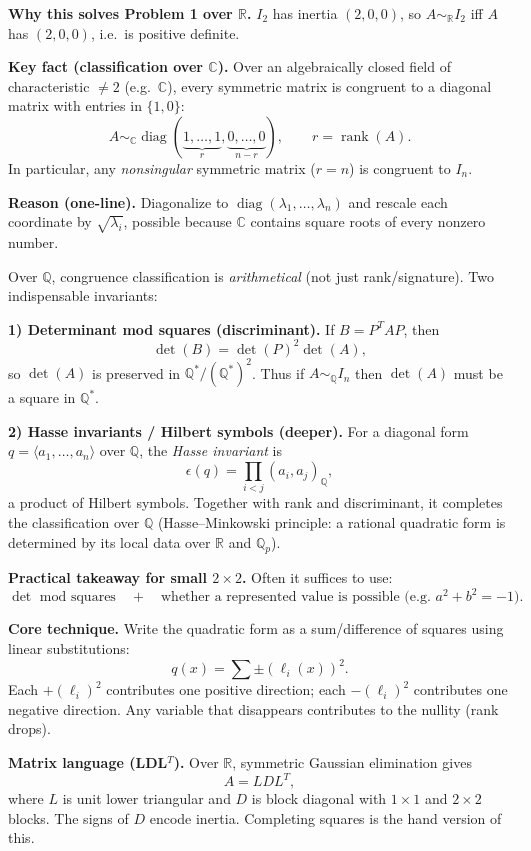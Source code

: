 \begin{problem}[CP-I-0055]
\textbf{Why this solves Problem 1 over $\mathbb R$.}
$I_2$ has inertia $(2,0,0)$, so $A\sim_{\mathbb R}I_2$ iff $A$ has $(2,0,0)$, i.e.\ is positive definite.

\textbf{Key fact (classification over $\mathbb C$).}
Over an algebraically closed field of characteristic $\neq 2$ (e.g.\ $\mathbb C$),
every symmetric matrix is congruent to a diagonal matrix with entries in $\{1,0\}$:
\[
A \sim_{\mathbb C} \operatorname{diag}(\underbrace{1,\dots,1}_{r},\underbrace{0,\dots,0}_{n-r}),
\qquad r=\operatorname{rank}(A).
\]
In particular, any \emph{nonsingular} symmetric matrix ($r=n$) is congruent to $I_n$.

\textbf{Reason (one-line).}
Diagonalize to $\operatorname{diag}(\lambda_1,\dots,\lambda_n)$ and rescale each coordinate by $\sqrt{\lambda_i}$,
possible because $\mathbb C$ contains square roots of every nonzero number.

Over $\mathbb Q$, congruence classification is \emph{arithmetical} (not just rank/signature).
Two indispensable invariants:

\textbf{1) Determinant mod squares (discriminant).}
If $B=P^TAP$, then
\[
\det(B)=\det(P)^2\det(A),
\]
so $\det(A)$ is preserved in $\mathbb Q^*/(\mathbb Q^*)^2$.
Thus if $A\sim_{\mathbb Q}I_n$ then $\det(A)$ must be a square in $\mathbb Q^*$.

\textbf{2) Hasse invariants / Hilbert symbols (deeper).}
For a diagonal form $q=\langle a_1,\dots,a_n\rangle$ over $\mathbb Q$,
the \emph{Hasse invariant} is
\[
\epsilon(q)=\prod_{i<j}(a_i,a_j)_{\mathbb Q},
\]
a product of Hilbert symbols. Together with rank and discriminant, it completes the classification over $\mathbb Q$
(Hasse--Minkowski principle: a rational quadratic form is determined by its local data over $\mathbb R$ and $\mathbb Q_p$).

\textbf{Practical takeaway for small $2\times 2$.}
Often it suffices to use:
\[
\det \text{ mod squares} \quad + \quad \text{whether a represented value is possible (e.g.\ }a^2+b^2=-1\text{)}.
\]

\textbf{Core technique.}
Write the quadratic form as a sum/difference of squares using linear substitutions:
\[
q(x)=\sum \pm (\ell_i(x))^2.
\]
Each $+(\ell_i)^2$ contributes one positive direction; each $-(\ell_i)^2$ contributes one negative direction.
Any variable that disappears contributes to the nullity (rank drops).

\textbf{Matrix language (LDL$^T$).}
Over $\mathbb R$, symmetric Gaussian elimination gives
\[
A = L D L^T,
\]
where $L$ is unit lower triangular and $D$ is block diagonal with $1\times 1$ and $2\times 2$ blocks.
The signs of $D$ encode inertia. Completing squares is the hand version of this.


\end{problem}
